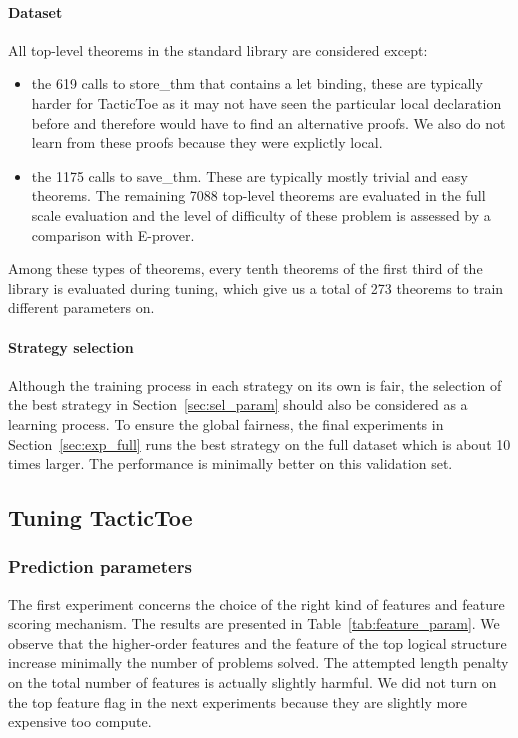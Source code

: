 \documentclass[runningheads,a4paper,draft]{svjour3}
\def\eprover{\textsf{E-prover}\xspace}
\def\tactictoe{\textsf{TacticToe}\xspace}
\begin{document}
\paragraph{Dataset}

All top-level theorems in the standard library are considered except:
\begin{itemize}
\item the 619 calls to store\_thm that contains a let binding, these are 
typically 
harder for \tactictoe as it may not have seen the particular local declaration 
before and therefore would have to find an alternative proofs. We also do not 
learn from these proofs because they were explictly local.
\item the 1175 calls to save\_thm. These are typically mostly trivial and easy 
theorems.
The remaining 7088 top-level theorems are evaluated in the full scale 
evaluation and the level of difficulty of these problem is assessed by a 
comparison with \eprover.
\end{itemize}

Among these types of theorems, every tenth theorems of the first third of the 
library is evaluated during tuning, which give us a total of 273 theorems to 
train different parameters on.

\paragraph{Strategy selection}
Although the training process in each strategy on its own is fair, the 
selection of the 
best strategy in Section~\ref{sec:sel_param} should also be considered as a 
learning 
process. To ensure the global fairness, the final experiments in 
Section~\ref{sec:exp_full} 
runs the best strategy on the full dataset which is about 10 times larger. The
performance is minimally better on this validation set.

\subsection{Tuning \tactictoe}

\subsubsection{Prediction parameters}
The first experiment concerns the choice of the right kind of features and 
feature scoring 
mechanism. The results are presented in Table~\ref{tab:feature_param}.
We observe that the higher-order features and the feature of the top logical 
structure increase minimally the number of problems solved. The attempted 
length penalty on the total number of features is actually slightly harmful.
We did not turn on the top feature flag in the next experiments because they 
are slightly more expensive too compute.
\end{document}
